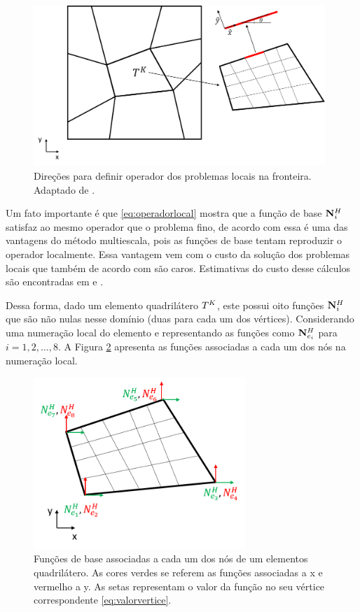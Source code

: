 \begin{figure}[!htbp]
\centering
\includegraphics[width=11cm]{chap06/figs/direcoesoperadorfronteira.png}
\caption{Direções para definir operador dos problemas locais na fronteira. Adaptado de \cite{casteletto}.}
\label{fig:direcoesoperadorfronteira}
\end{figure}


Um fato importante é que \eqref{eq:operadorlocal} mostra que a função de base $\mathbf{N}_{i}^H$ satisfaz ao mesmo operador que o problema fino, de acordo com \citet{thomashou} essa é uma das vantagens do método multiescala, pois as funções de base tentam reproduzir o operador localmente. Essa vantagem vem com o custo da solução dos problemas locais que também de acordo com \citet{thomashou} são caros. Estimativas do custo desse cálculos são encontradas em \citet{msparalelo} e \citet{mbuck}.

Dessa forma, dado um elemento quadrilátero $T^K$, este possui oito funções $\mathbf{N}_{i}^H$ que são não nulas nesse domínio (duas para cada um dos vértices). Considerando uma numeração local do elemento e representando as funções como ${\mathbf{N}_{e_{i}}^H}$ para $i=1,2,\dots, 8$. A Figura \ref{fig:coarsefunctionslocalnum} apresenta as funções associadas a cada um dos nós na numeração local.


\begin{figure}[!htbp]
\centering
\includegraphics[width=8cm]{chap06/figs/funcoesDeBaseGrossasColorido.png}
\caption{Funções de base associadas a cada um dos nós de um elementos quadrilátero. As cores verdes se referem as funções associadas a x e vermelho a y. As setas representam o valor da função no seu vértice correspondente \eqref{eq:valorvertice}.}
\label{fig:coarsefunctionslocalnum}
\end{figure}

